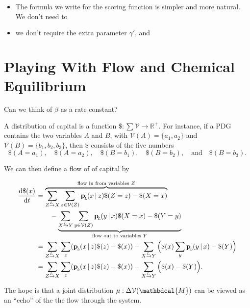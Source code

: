 \documentclass[twoside]{article} %
\theoremstyle{plain}
\theoremstyle{definition}
\newcommand{\mat}[1]{\mathbf{#1}}
\newcommand{\ssub}[1]{_{\!_{#1}\!}}
\newcommand{\bp}[1][L]{\mat{p}\ssub{#1}}
\newcommand{\V}{\mathcal V}
\newcommand{\dg}[1]{\mathbdcal{#1}}
\newcommand{\ed}[3]{#2%
    	  \overset{\smash{\mskip-5mu\raisebox{-1pt}{$\scriptscriptstyle
    	        #1$}}}{\rightarrow} #3}
\begin{document}
    \begin{itemize}
        \item The formula we write for the scoring function is simpler and more natural. 
            We don't need to 
        \item we don't require the extra parameter $\gamma'$, and
        
    \end{itemize}
    
    
    
\clearpage
    \section*{Playing With Flow and Chemical Equilibrium}
    Can we think of $\beta$ as a rate constant?
    
    \begin{defn}
        A distribution of capital is a function $\$ : \sum \V \to \mathbb R^+$. 
        For instance, if a PDG contains the two variables $A$ and $B$, with $\V(A) = \{a_1, a_2\}$ and $\V(B) = \{b_1, b_2, b_3\}$, then $\$$ consists of the five numbers
        \[
            \$(A\!=\!a_1),\quad
            \$(A\!=\!a_2),\quad
            \$(B\!=\!b_1),\quad
            \$(B\!=\!b_2),\quad\text{and}\quad
            \$(B\!=\!b_3).
        \]
    \end{defn}
    
    
    We can then define a flow of of capital by
    
    \begin{align*}
        \frac{\mathrm d \$(x) }{\mathrm dt} &=  
            \overbrace{%
                \sum_{\ed LZX} \sum_{z \in \V(Z)} \bp(x\,|\,z) \$(Z=z)-\$(X=x)
            }^{\text{flow in from variables $Z$}} \\
            &\qquad - 
                \underbrace{%
                \sum_{\ed LXY} \sum_{y \in \V(Z)} \bp(y\,|\,x) \$(X=x)-\$(Y=y)
                }_{\text{flow out to variables $Y$}}
            \\
            &= \sum_{\ed LZX} \sum_z (\bp(x\,|\,z) \$(z)-\$(x))
                -\sum_{\ed LXY} \Big(\$(x)\sum_{y} \bp(y\,|\,x) - \$(Y) \Big) \\
            &= \sum_{\ed LZX} \sum_z (\bp(x\,|\,z) \$(z)-\$(x))
                -\sum_{\ed LXY} \Big(\$(x) - \$(Y) \Big)
            .
    \end{align*}
    
    
    The hope is that a joint distribution $\mu : \Delta \V(\dg M)$ can be viewed as an ``echo'' of the the flow through the system.
    
    
    \begin{example}
            
    \end{example}    
    
    
\end{document}
